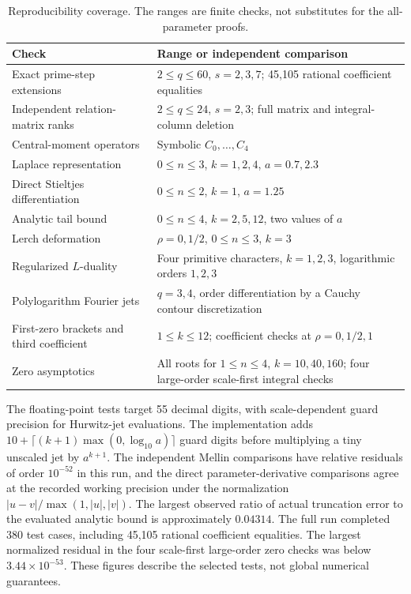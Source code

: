 \documentclass[11pt]{article}
\theoremstyle{definition}
\theoremstyle{remark}
\begin{document}
\begin{table}[htbp]\centering\small
\begin{tabular}{p{}p{}}
\toprule
Check & Range or independent comparison\\
\midrule
Exact prime-step extensions & $2\leq q\leq60$, $s=2,3,7$; 45,105 rational coefficient equalities\\
Independent relation-matrix ranks & $2\leq q\leq24$, $s=2,3$; full matrix and integral-column deletion\\
Central-moment operators & Symbolic $C_0,\ldots,C_4$\\
Laplace representation & $0\leq n\leq3$, $k=1,2,4$, $a=0.7,2.3$\\
Direct Stieltjes differentiation & $0\leq n\leq2$, $k=1$, $a=1.25$\\
Analytic tail bound & $0\leq n\leq4$, $k=2,5,12$, two values of $a$\\
Lerch deformation & $\rho=0,1/2$, $0\leq n\leq3$, $k=3$\\
Regularized $L$-duality & Four primitive characters, $k=1,2,3$, logarithmic orders $1,2,3$\\
Polylogarithm Fourier jets & $q=3,4$, order differentiation by a Cauchy contour discretization\\
First-zero brackets and third coefficient & $1\leq k\leq12$; coefficient checks at $\rho=0,1/2,1$\\
Zero asymptotics & All roots for $1\leq n\leq4$, $k=10,40,160$; four large-order scale-first integral checks\\
\bottomrule
\end{tabular}
\caption{Reproducibility coverage. The ranges are finite checks, not substitutes for the all-parameter proofs.}
\label{tab:checks}
\end{table}

The floating-point tests target 55 decimal digits, with scale-dependent guard precision for Hurwitz-jet evaluations. The implementation adds $10+\lceil(k+1)\max(0,\log_{10}a)\rceil$ guard digits before multiplying a tiny unscaled jet by $a^{k+1}$. The independent Mellin comparisons have relative residuals of order $10^{-52}$ in this run, and the direct parameter-derivative comparisons agree at the recorded working precision under the normalization $|u-v|/\max(1,|u|,|v|)$. The largest observed ratio of actual truncation error to the evaluated analytic bound is approximately $0.04314$. The full run completed 380 test cases, including 45,105 rational coefficient equalities. The largest normalized residual in the four scale-first large-order zero checks was below $3.44\times10^{-53}$. These figures describe the selected tests, not global numerical guarantees.
\end{document}
